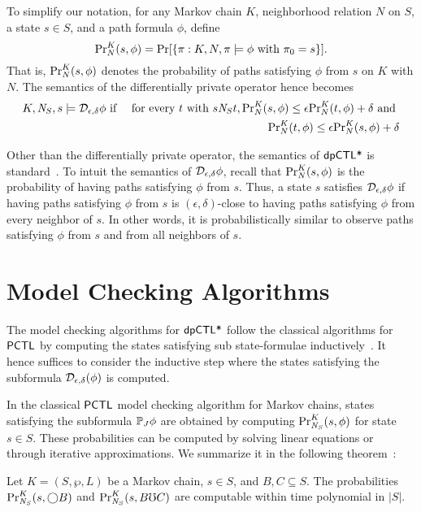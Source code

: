 To simplify our notation, for any Markov chain $K$, neighborhood
relation $N$ on $S$, a state $s \in S$, and a path formula $\phi$,
define
\[
\myPr{s}{K}{N}{\phi} =
\Pr [ \{ \pi : K, N, \pi \models \phi \textmd{ with } \pi_0 = s \} ].
\]
That is, $\myPr{s}{K}{N}{\phi}$ denotes the probability of paths
satisfying $\phi$ from $s$ on $K$ with $N$. The semantics of the
differentially private operator hence becomes
\begin{eqnarray*}
  K, \neighbor{S}, s \models \dpriv{\epsilon}{\delta} \phi
  & \textmd{ if } &
  \textmd{for every } t \textmd{ with }  s \neighbor{S} t,
      \myPr{s}{K}{N}{\phi} \leq \epsilon \myPr{t}{K}{N}{\phi} + \delta
      \textmd{ and }\\
  & &  \myPr{t}{K}{N}{\phi} \leq \epsilon \myPr{s}{K}{N}{\phi} + \delta
\end{eqnarray*}

Other than the differentially private operator, the semantics of
$\dpCTL$ is standard~\cite{BK:08:PMC}.
To intuit the semantics of $\dpriv{\epsilon}{\delta} \phi$,
recall that  $\myPr{s}{K}{N}{\phi}$ is the probability of having
paths satisfying $\phi$ from $s$. Thus, a state $s$ satisfies
$\dpriv{\epsilon}{\delta} \phi$ if having paths satisfying $\phi$
from $s$ is $(\epsilon, \delta)$-close to having paths satisfying
$\phi$ from every neighbor of $s$. In other words, it is
probabilistically similar to observe paths satisfying $\phi$ from $s$
and from all neighbors of $s$.

\section{Model Checking Algorithms}
The model checking algorithms for $\dpCTL$ follow the classical
algorithms for $\PCTL$ by computing the states satisfying
sub state-formulae inductively~\cite{BK:08:PMC}. It hence suffices to
consider the inductive step where the states satisfying the subformula
$\dpriv{\epsilon}{\delta} (\phi)$ is computed.


In the classical $\PCTL$ model checking algorithm for Markov chains,
states satisfying the subformula $\PJ{J} \phi$ are obtained by
computing $\myPr{s}{K}{\neighbor{S}}{\phi}$ for state $s \in S$.
These probabilities can be computed by solving linear equations or
through iterative approximations. We summarize it in the following
theorem~\cite{BK:08:PMC}:

\begin{lemma}
  Let $K = (S, \wp, L)$ be a Markov chain, $s
  \in S$, and $B, C \subseteq S$. The probabilities
  $\myPr{s}{K}{\neighbor{S}}{\gX B}$ and
  $\myPr{s}{K}{\neighbor{S}}{B \mho C}$
\hide{
  $\Pr[\{ \pi : K, \neighbor{K}, \pi \models B \buntil{n} C \textmd{
    with } \pi_0 = s \}]$
} are computable within time polynomial in
  $|S|$.
  \label{lemma:PJ-subroutines}
\end{lemma}

